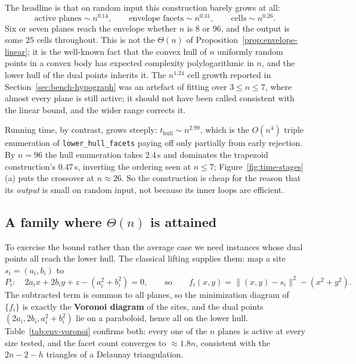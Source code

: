 \documentclass[11pt]{article}
\begin{document}
The headline is that on random input this construction barely grows at all:
\[
  \text{active planes} \sim n^{0.14}, \qquad
  \text{envelope facets} \sim n^{0.31}, \qquad
  \text{cells} \sim n^{0.26}.
\]
Six or seven planes reach the envelope whether $n$ is 8 or 96, and the output is
some 25 cells throughout.  This is not the $\Theta(n)$ of
Proposition~\ref{prop:envelope-linear}; it is the well-known fact that the
convex hull of $n$ uniformly random points in a convex body has expected
complexity polylogarithmic in $n$, and the lower hull of the dual points
inherits it.  The $n^{1.24}$ cell growth reported in
Section~\ref{sec:bench-hypograph} was an artefact of fitting over $3 \le n \le
7$, where almost every plane is still active; it should not have been called
consistent with the linear bound, and the wider range corrects it.



Running time, by contrast, grows steeply: $t_{\text{hull}} \sim n^{2.99}$,
which is the $O(n^4)$ triple enumeration of \texttt{lower\_hull\_facets}
paying off only partially from early rejection.  By $n = 96$ the hull
enumeration takes $2.4$\,s and dominates the trapezoid construction's
$0.47$\,s, inverting the ordering seen at $n \le 7$; Figure~\ref{fig:time-stages}(a)
puts the crossover at $n \approx 26$.  So the construction is
cheap for the reason that its \emph{output} is small on random input, not
because its inner loops are efficient.



\subsection{A family where $\Theta(n)$ is attained}
\label{sec:bench-voronoi}

To exercise the bound rather than the average case we need instances whose dual
points all reach the lower hull.  The classical lifting supplies them: map a
site $s_i = (a_i, b_i)$ to
\[
  P_i:\quad 2 a_i x + 2 b_i y + z - (a_i^2 + b_i^2) = 0,
  \qquad\text{so}\qquad
  f_i(x,y) = \lVert (x,y) - s_i \rVert^2 - (x^2 + y^2).
\]
The subtracted term is common to all planes, so the minimization diagram of
$\{f_i\}$ is exactly the \textbf{Voronoi diagram} of the sites, and the dual
points $(2a_i, 2b_i, a_i^2{+}b_i^2)$ lie on a paraboloid, hence all on the lower
hull.  Table~\ref{tab:env-voronoi} confirms both: every one of the $n$ planes is
active at every size tested, and the facet count converges to
$\approx 1.8n$, consistent with the $2n - 2 - h$ triangles of a Delaunay
triangulation.
\end{document}

